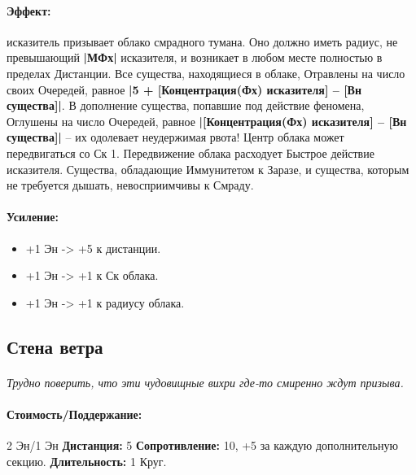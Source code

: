\begin{itemize}
\begin{itemize}
\paragraph{Эффект: }исказитель призывает облако смрадного тумана. Оно должно иметь радиус, не превышающий 
\textbf{|МФх|} исказителя, и возникает в любом месте полностью в пределах Дистанции. Все существа, находящиеся в облаке, Отравлены на число своих Очередей, равное 
\textbf{|5 + [Концентрация(Фх) исказителя] – [Вн существа]|}. В дополнение существа, попавшие под действие феномена,  Оглушены на число Очередей, равное 
\textbf{|[Концентрация(Фх) исказителя] – [Вн существа]|} – их одолевает неудержимая рвота! 
\newline Центр облака может передвигаться со Ск 1. Передвижение облака расходует Быстрое действие исказителя. 
\newline Существа, обладающие Иммунитетом к Заразе, и существа, которым не требуется дышать, невосприимчивы к Смраду.
\paragraph{Усиление:}
\begin{itemize}
\item+1 Эн -> +5 к дистанции.
\item+1 Эн -> +1 к Ск облака.
\item+1 Эн -> +1 к радиусу облака.
\end{itemize}
\subsection{Стена ветра}
\paragraph{} 
\textit{
\tbd Трудно поверить, что эти чудовищные вихри где-то смиренно ждут призыва.}
\paragraph{Стоимость/Поддержание: }2 Эн/1 Эн
\newline
\textbf{Дистанция: }5
\newline
\textbf{Сопротивление: }10, +5 за каждую дополнительную секцию.
\newline 
\textbf{Длительность: }1 Круг.

\end{itemize}
\end{itemize}

